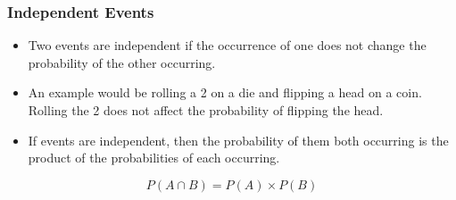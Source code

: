 \documentclass{beamer}
\begin{document}
\begin{frame}
\frametitle{Independent Events}
\Large
\begin{itemize}
\item Two events are independent if the occurrence of one does not change the probability of the other occurring.
\item An example would be rolling a 2 on a die and flipping a head on a coin. Rolling the 2 does not affect the probability of flipping the head.
\item If events are independent, then the probability of them both occurring is the product of the probabilities of each occurring.
\end{itemize}
   \[P(A \cap B) = P(A) \times P(B)\]
\end{frame}
\end{document}
